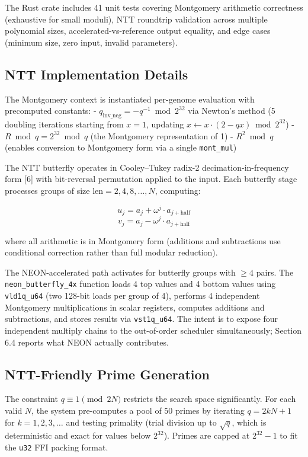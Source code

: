 The Rust crate includes 41 unit tests covering Montgomery arithmetic correctness (exhaustive for small moduli), NTT roundtrip validation across multiple polynomial sizes, accelerated-vs-reference output equality, and edge cases (minimum size, zero input, invalid parameters).

\subsection{NTT Implementation Details}\label{ntt-implementation-details}

The Montgomery context is instantiated per-genome evaluation with precomputed constants:
- \(q_{\text{inv\_neg}} = -q^{-1} \bmod 2^{32}\) via Newton's method (5 doubling iterations starting from \(x = 1\), updating \(x \leftarrow x \cdot (2 - qx) \bmod 2^{32}\))
- \(R \bmod q = 2^{32} \bmod q\) (the Montgomery representation of 1)
- \(R^2 \bmod q\) (enables conversion to Montgomery form via a single \texttt{mont\_mul})

The NTT butterfly operates in Cooley--Tukey radix-2 decimation-in-frequency form [6] with bit-reversal permutation applied to the input. Each butterfly stage processes groups of size \(\text{len} = 2, 4, 8, \ldots, N\), computing:

\[u_j = a_j + \omega^j \cdot a_{j + \text{half}}\]
\[v_j = a_j - \omega^j \cdot a_{j + \text{half}}\]

where all arithmetic is in Montgomery form (additions and subtractions use conditional correction rather than full modular reduction).

The NEON-accelerated path activates for butterfly groups with \(\geq 4\) pairs. The \texttt{neon\_butterfly\_4x} function loads 4 top values and 4 bottom values using \texttt{vld1q\_u64} (two 128-bit loads per group of 4), performs 4 independent Montgomery multiplications in scalar registers, computes additions and subtractions, and stores results via \texttt{vst1q\_u64}. The intent is to expose four independent multiply chains to the out-of-order scheduler simultaneously; Section 6.4 reports what NEON actually contributes.

\subsection{NTT-Friendly Prime Generation}\label{ntt-friendly-prime-generation}

The constraint \(q \equiv 1 \pmod{2N}\) restricts the search space significantly. For each valid \(N\), the system pre-computes a pool of 50 primes by iterating \(q = 2kN + 1\) for \(k = 1, 2, 3, \ldots\) and testing primality (trial division up to \(\sqrt{q}\), which is deterministic and exact for values below \(2^{32}\)). Primes are capped at \(2^{32} - 1\) to fit the \texttt{u32} FFI packing format.

